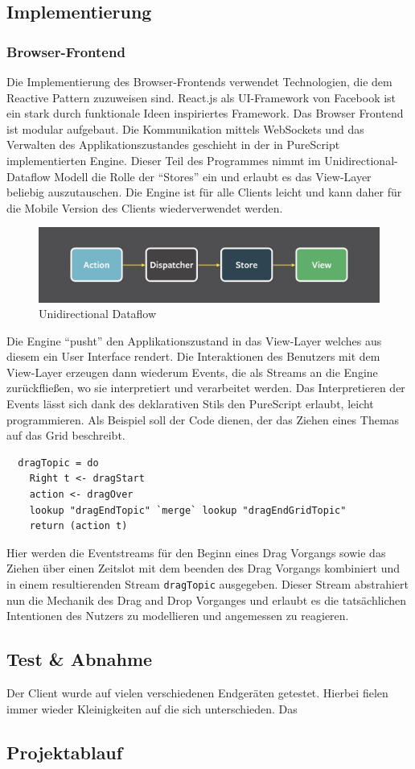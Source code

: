 \subsection{Implementierung}
\subsubsection{Browser-Frontend}
Die Implementierung des Browser-Frontends verwendet Technologien, die dem Reactive Pattern zuzuweisen sind.
React.js als UI-Framework von Facebook ist ein stark durch funktionale
Ideen inspiriertes Framework. Das Browser Frontend ist modular
aufgebaut. Die Kommunikation mittels WebSockets und das Verwalten des
Applikationszustandes geschieht in der in PureScript implementierten
Engine. Dieser Teil des Programmes  nimmt im Unidirectional-Dataflow
Modell die Rolle der ``Stores'' ein und erlaubt es das View-Layer
beliebig auszutauschen. Die Engine ist für alle Clients leicht und
kann daher für die Mobile Version des Clients wiederverwendet werden.
\begin{figure}[h]
\includegraphics[scale=0.3]{img/Unidirectional.png}
\caption{Unidirectional Dataflow}
\end{figure}

Die Engine ``pusht'' den Applikationszustand in das View-Layer welches aus diesem ein User Interface rendert.
Die Interaktionen des Benutzers mit dem View-Layer erzeugen dann
wiederum Events, die als Streams an die Engine zurückfließen, wo sie
interpretiert und verarbeitet werden. Das Interpretieren der Events
lässt sich dank des deklarativen Stils den PureScript erlaubt, leicht
programmieren. Als Beispiel soll der Code dienen, der das Ziehen eines
Themas auf das Grid beschreibt.

\begin{lstlisting}
  dragTopic = do
    Right t <- dragStart
    action <- dragOver
    lookup "dragEndTopic" `merge` lookup "dragEndGridTopic"
    return (action t)
\end{lstlisting}

Hier werden die Eventstreams für den Beginn eines Drag Vorgangs sowie
das Ziehen über einen Zeitslot mit dem beenden des Drag Vorgangs
kombiniert und in einem resultierenden Stream \texttt{dragTopic}
ausgegeben. Dieser Stream abstrahiert nun die Mechanik des Drag and
Drop Vorganges und erlaubt es die tatsächlichen Intentionen des
Nutzers zu modellieren und angemessen zu reagieren.
\subsection{Test \& Abnahme}
Der Client wurde auf vielen verschiedenen Endgeräten getestet. Hierbei
fielen immer wieder Kleinigkeiten auf die sich unterschieden. Das
\subsection{Projektablauf}

